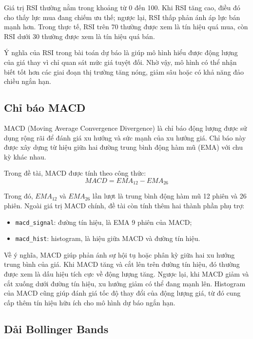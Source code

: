 Giá trị RSI thường nằm trong khoảng từ 0 đến 100. Khi RSI tăng cao, điều đó cho thấy lực mua đang chiếm ưu thế; ngược lại, RSI thấp phản ánh áp lực bán mạnh hơn. Trong thực tế, RSI trên 70 thường được xem là tín hiệu quá mua, còn RSI dưới 30 thường được xem là tín hiệu quá bán.

Ý nghĩa của RSI trong bài toán dự báo là giúp mô hình hiểu được động lượng của giá thay vì chỉ quan sát mức giá tuyệt đối. Nhờ vậy, mô hình có thể nhận biết tốt hơn các giai đoạn thị trường tăng nóng, giảm sâu hoặc có khả năng đảo chiều ngắn hạn.

\subsection{Chỉ báo MACD}

MACD (Moving Average Convergence Divergence) là chỉ báo động lượng được sử dụng rộng rãi để đánh giá xu hướng và sức mạnh của xu hướng giá. Chỉ báo này được xây dựng từ hiệu giữa hai đường trung bình động hàm mũ (EMA) với chu kỳ khác nhau.

Trong đề tài, MACD được tính theo công thức:
\begin{equation}
    MACD = EMA_{12} - EMA_{26}
\end{equation}

Trong đó, $EMA_{12}$ và $EMA_{26}$ lần lượt là trung bình động hàm mũ 12 phiên và 26 phiên. Ngoài giá trị MACD chính, đề tài còn tính thêm hai thành phần phụ trợ:
\begin{itemize}
    \item \texttt{macd\_signal}: đường tín hiệu, là EMA 9 phiên của MACD;
    \item \texttt{macd\_hist}: histogram, là hiệu giữa MACD và đường tín hiệu.
\end{itemize}

Về ý nghĩa, MACD giúp phản ánh sự hội tụ hoặc phân kỳ giữa hai xu hướng trung bình của giá. Khi MACD tăng và cắt lên trên đường tín hiệu, đó thường được xem là dấu hiệu tích cực về động lượng tăng. Ngược lại, khi MACD giảm và cắt xuống dưới đường tín hiệu, xu hướng giảm có thể đang mạnh lên. Histogram của MACD cũng giúp đánh giá tốc độ thay đổi của động lượng giá, từ đó cung cấp thêm tín hiệu hữu ích cho mô hình dự báo ngắn hạn.

\subsection{Dải Bollinger Bands}

